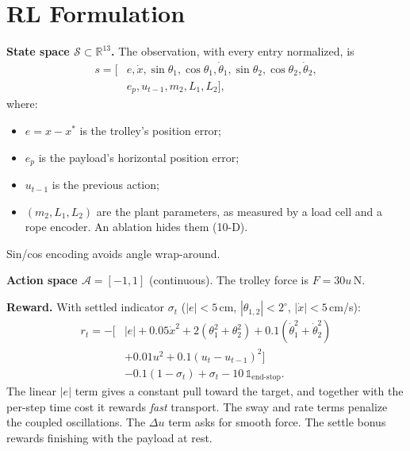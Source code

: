 \documentclass[10pt,conference]{IEEEtran}
\begin{document}
\section{RL Formulation}
\textbf{State space $\mathcal S\subset\mathbb R^{13}$.} The observation, with every entry normalized, is
\begin{align*}
s=[&e,\dot x,\sin\theta_1,\cos\theta_1,\dot\theta_1,\sin\theta_2,\cos\theta_2,\dot\theta_2,\\
&e_p,u_{t-1},m_2,L_1,L_2],
\end{align*}
where:
\begin{itemize}
\item $e=x-x^\ast$ is the trolley's position error;
\item $e_p$ is the payload's horizontal position error;
\item $u_{t-1}$ is the previous action;
\item $(m_2,L_1,L_2)$ are the plant parameters, as measured by a load cell and a rope encoder. An ablation hides them (10-D).
\end{itemize}
Sin/cos encoding avoids angle wrap-around.

\textbf{Action space $\mathcal A=[-1,1]$} (continuous). The trolley force is $F=30u$\,N.

\textbf{Reward.} With settled indicator $\sigma_t$ ($|e|<5$\,cm, $|\theta_{1,2}|<2^\circ$, $|\dot x|<5$\,cm/s):
\begin{align*}
r_t = -\big[&|e| + 0.05\dot x^2 + 2(\theta_1^2+\theta_2^2) + 0.1(\dot\theta_1^2+\dot\theta_2^2)\\
&+ 0.01u^2 + 0.1(u_t-u_{t-1})^2\big]\\
&- 0.1(1-\sigma_t) + \sigma_t - 10\,\mathbb 1_{\text{end-stop}}.
\end{align*}
The linear $|e|$ term gives a constant pull toward the target, and together with the per-step time cost it rewards \emph{fast} transport. The sway and rate terms penalize the coupled oscillations. The $\Delta u$ term asks for smooth force. The settle bonus rewards finishing with the payload at rest.
\end{document}
